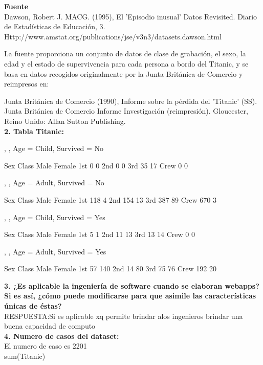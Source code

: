 \documentclass[10pt]{report}
\begin{document}
\textbf{Fuente}\\

Dawson, Robert J. MACG. (1995), El 'Episodio inusual' Datos Revisited. Diario de Estadísticas de Educación, 3. Http://www.amstat.org/publications/jse/v3n3/datasets.dawson.html

La fuente proporciona un conjunto de datos de clase de grabación, el sexo, la edad y el estado de supervivencia para cada persona a bordo del Titanic, y se basa en datos recogidos originalmente por la Junta Británica de Comercio y reimpresos en:

Junta Británica de Comercio (1990), Informe sobre la pérdida del 'Titanic' (SS). Junta Británica de Comercio Informe Investigación (reimpresión). Gloucester, Reino Unido: Allan Sutton Publishing.\\


\textbf{2. Tabla Titanic:}\\
\begin{Schunk}
\begin{Soutput}
, , Age = Child, Survived = No

      Sex
Class  Male Female
  1st     0      0
  2nd     0      0
  3rd    35     17
  Crew    0      0

, , Age = Adult, Survived = No

      Sex
Class  Male Female
  1st   118      4
  2nd   154     13
  3rd   387     89
  Crew  670      3

, , Age = Child, Survived = Yes

      Sex
Class  Male Female
  1st     5      1
  2nd    11     13
  3rd    13     14
  Crew    0      0

, , Age = Adult, Survived = Yes

      Sex
Class  Male Female
  1st    57    140
  2nd    14     80
  3rd    75     76
  Crew  192     20
\end{Soutput}
\end{Schunk}
\textbf{3. ¿Es aplicable la ingeniería de software cuando se elaboran webapps? Si es así, ¿cómo puede
modificarse para que asimile las características únicas de éstas?}\\

RESPUESTA:Si es aplicable xq permite brindar alos ingenieros brindar una buena capacidad de computo
\\


\textbf{4. Numero de casos del dataset:}\\
El numero de caso es 2201\\
sum(Titanic)\\




\begin{center}

\end{center}
\end{document}
